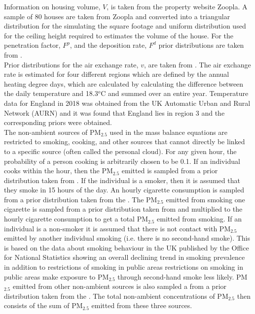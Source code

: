 \documentclass{article}
\begin{document}
\noindent Information on housing volume, $V$, is taken from the property website Zoopla. A sample of 80 houses are taken from Zoopla and converted into a triangular distribution for the simulating the square footage and uniform distribution used for the ceiling height required to estimates the volume of the house. For the penetration factor, $F^p$, and the deposition rate, $F^d$ prior distributions are taken from \citet{burke2001population}. \\

\noindent Prior distributions for the air exchange rate, $v$, are taken from \citet{murray1995residential}. The air exchange rate is estimated for four different regions which are defined by the annual heating degree days, which are calculated by calculating the difference between the daily temperature and 18.3$^{o}$C and summed over an entire year. Temperature data for England in 2018 was obtained from the UK Automatic Urban and Rural Network (AURN) \citep{AURN} and it was found that England lies in region 3 and the corresponding priors were obtained. \\

\noindent The non-ambient sources of PM$_{2.5}$ used in the mass balance equations are restricted to smoking, cooking, and other sources that cannot directly be linked to a specific source (often called the personal cloud). For any given hour, the probability of a person cooking is arbitrarily chosen to be 0.1. If an individual cooks within the hour, then the PM$_{2.5}$ emitted is sampled from a prior distribution taken from \citet{ozkaynak1996personal}. If the individual is a smoker, then it is assumed that they smoke in 15 hours of the day. An hourly cigarette consumption is sampled from a prior distribution taken from the \citet{ONS2020}. The PM$_{2.5}$ emitted from smoking one cigarette is sampled from a prior distribution taken from \citet{ozkaynak1996personal} and multiplied to the hourly cigarette consumption to get a total PM$_{2.5}$ emitted from smoking. If an individual is a non-smoker it is assumed that there is not contact with PM$_{2.5}$ emitted by another individual smoking (i.e. there is no second-hand smoke). This is based on the data about smoking behaviour in the UK published by the Office for National Statistics showing an overall declining trend in smoking prevalence in addition to restrictions of smoking in public areas restrictions on smoking in public areas make exposure to PM$_{2.5}$ through second-hand smoke less likely. PM$_{2.5}$ emitted from other non-ambient sources is also sampled a from a prior distribution taken from the \citet{ONS2020}. The total non-ambient concentrations of PM$_{2.5}$ then consists of the sum of PM$_{2.5}$ emitted from these three sources. \\
\end{document}
